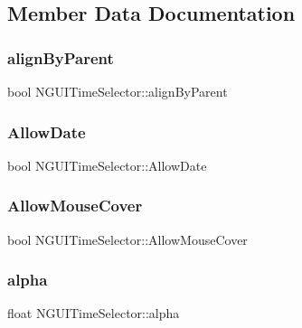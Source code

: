 \subsection{Member Data Documentation}
\hypertarget{class_n_g_u_i_time_selector_a4a681582a974f1201b543d2b3f6b3d39}{}\label{class_n_g_u_i_time_selector_a4a681582a974f1201b543d2b3f6b3d39} 
\subsubsection{\texorpdfstring{align\+By\+Parent}{alignByParent}}
{\footnotesize\ttfamily bool N\+G\+U\+I\+Time\+Selector\+::align\+By\+Parent}

\hypertarget{class_n_g_u_i_time_selector_a055a7175ebffba2b2731f2f36eb6023e}{}\label{class_n_g_u_i_time_selector_a055a7175ebffba2b2731f2f36eb6023e} 
\subsubsection{\texorpdfstring{Allow\+Date}{AllowDate}}
{\footnotesize\ttfamily bool N\+G\+U\+I\+Time\+Selector\+::\+Allow\+Date}

\hypertarget{class_n_g_u_i_time_selector_ab8beb867f18b54b3705672773f5a6a48}{}\label{class_n_g_u_i_time_selector_ab8beb867f18b54b3705672773f5a6a48} 
\subsubsection{\texorpdfstring{Allow\+Mouse\+Cover}{AllowMouseCover}}
{\footnotesize\ttfamily bool N\+G\+U\+I\+Time\+Selector\+::\+Allow\+Mouse\+Cover}

\hypertarget{class_n_g_u_i_time_selector_a0c158e8d55bd1170cc020f509617a3da}{}\label{class_n_g_u_i_time_selector_a0c158e8d55bd1170cc020f509617a3da} 
\subsubsection{\texorpdfstring{alpha}{alpha}}
{\footnotesize\ttfamily float N\+G\+U\+I\+Time\+Selector\+::alpha}

